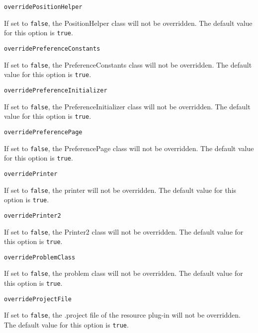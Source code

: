 \noindent\texttt{overridePositionHelper}
\begin{myindentpar}{1cm}
If set to \texttt{false}, the PositionHelper class will not be overridden. The default value for this option is \texttt{true}.
\end{myindentpar}

\noindent\texttt{overridePreferenceConstants}
\begin{myindentpar}{1cm}
If set to \texttt{false}, the PreferenceConstants class will not be overridden. The default value for this option is \texttt{true}.
\end{myindentpar}

\noindent\texttt{overridePreferenceInitializer}
\begin{myindentpar}{1cm}
If set to \texttt{false}, the PreferenceInitializer class will not be overridden. The default value for this option is \texttt{true}.
\end{myindentpar}

\noindent\texttt{overridePreferencePage}
\begin{myindentpar}{1cm}
If set to \texttt{false}, the PreferencePage class will not be overridden. The default value for this option is \texttt{true}.
\end{myindentpar}

\noindent\texttt{overridePrinter}
\begin{myindentpar}{1cm}
If set to \texttt{false}, the printer will not be overridden. The default value for this option is \texttt{true}.
\end{myindentpar}

\noindent\texttt{overridePrinter2}
\begin{myindentpar}{1cm}
If set to \texttt{false}, the Printer2 class will not be overridden. The default value for this option is \texttt{true}.
\end{myindentpar}

\noindent\texttt{overrideProblemClass}
\begin{myindentpar}{1cm}
If set to \texttt{false}, the problem class will not be overridden. The default value for this option is \texttt{true}.
\end{myindentpar}

\noindent\texttt{overrideProjectFile}
\begin{myindentpar}{1cm}
If set to \texttt{false}, the .project file of the resource plug-in will not be overridden. The default value for this option is \texttt{true}.
\end{myindentpar}

